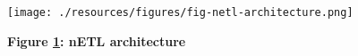 \begin{figure}[H]
    \centering
    \begin{mdframed}
        \centering
        \texttt{[image: ./resources/figures/fig-netl-architecture.png]}
    \end{mdframed}
    \caption[nETL architecture]{\textbf{Figure \ref{fig-nETL}: nETL architecture}}
    \label{fig-nETL}
\end{figure}